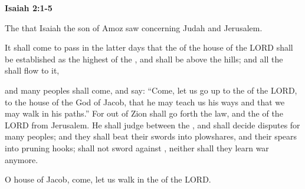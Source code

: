 \documentclass[11pt]{article}
\begin{document}
\begin{center}
{\Huge\bfseries Isaiah 2:1-5}
\end{center}
\vspace{10pt}



\begin{biblicaloutline}[Isaiah 2:1-5]
    

    \begin{versesection}{2em}
         The  that Isaiah the son of Amoz saw concerning Judah and Jerusalem.
    \end{versesection}
    
    
    \begin{versesection}{2em}
         It shall come to pass in the latter days
        \poetryline that the  of the house of the LORD
        shall be established as the highest of the ,
        \poetryline and shall be  above the hills;
        and all the  shall flow to it,
        
        \poetryline  and many peoples shall come, and say:
        ``Come, let us go up to the  of the LORD,
        \poetryline to the house of the God of Jacob,
        that he may teach us his ways
        \poetryline and that we may walk in his paths.''
        For out of Zion shall go forth the law,
        \poetryline and the  of the LORD from Jerusalem.
         He shall judge between the ,
        \poetryline and shall decide disputes for many peoples;
        and they shall beat their swords into plowshares,
        \poetryline and their spears into pruning hooks;
         shall not  sword against ,
        \poetryline neither shall they learn war anymore.
        
         O house of Jacob,
        \poetryline come, let us walk
        \poetryline in the  of the LORD.
    \end{versesection}

\end{biblicaloutline}
\end{document}
